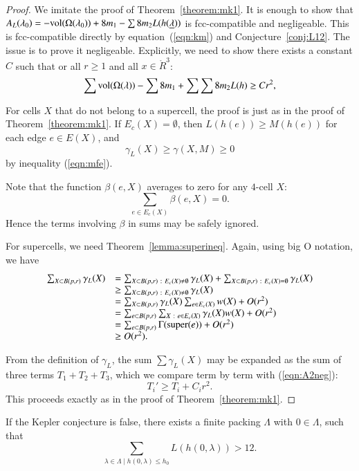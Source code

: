 \begin{proof}  We imitate the proof of Theorem~\ref{theorem:mk1}.
It is enough to show that $A_L(\lambda_0)  = -{\operatorname{vol}}(\Omega(\lambda_0)) + 8 m_1 - \sum 8 m_2 L(h({\underline{\lambda}}))$ is fcc-compatible and negligeable. 
This is fcc-compatible directly
by equation~(\ref{eqn:km})
and Conjecture~\ref{conj:L12}.  The issue is to prove it negligeable.  Explicitly, we need
to show there exists a constant  $C$ such that or all $r\ge 1$ and all $x\in\ring{R}^3$:
\begin{equation}\label{eqn:A2neg}
  \sum {\operatorname{vol}}(\Omega(\lambda)) -\sum 8m_1 + \sum \sum 8 m_2 L(h) \ge C r^2,
\end{equation}

For cells $X$ that do not belong to a supercell,
the proof is just as in the proof of Theorem~\ref{theorem:mk1}.
If $E_c(X)=\emptyset$, then 
$L(h(e))\ge M(h(e))$ for each edge $e\in E(X)$, and
$$\gamma_L(X)\ge \gamma(X,M)\ge 0$$ 
by inequality (\ref{eqn:mfe}).

Note that the function $\beta(e,X)$ averages to zero for any $4$-cell $X$:
$$
\sum_{e\in E_c(X)} \beta(e,X) = 0.
$$
Hence the terms involving $\beta$ in sums may be safely ignored.

For supercells, we need Theorem~\ref{lemma:superineq}.
Again, using big O notation, we have
$$
\begin{array}{lll}
\sum_{X\subset B(p,r)} \gamma_L(X) &= 
\sum_{X\subset B(p,r)\ :\  E_c(X)\ne\emptyset} \gamma_L(X) +
\sum_{X\subset B(p,r)\ :\  E_c(X)=\emptyset} \gamma_L(X) \\
&\ge \sum_{X\subset B(p,r)\ :\  E_c(X)\ne\emptyset} \gamma_L(X) \\
&=\sum_{X\subset B(p,r)}\gamma_L(X)\sum_{e \in E_c(X)}w(X) + O(r^2)\\
&=\sum_{e\subset B(p,r)}\sum_{X\ :\  e \in E_c(X)}\gamma_L(X)w(X) + O(r^2)\\
&=\sum_{e\subset B(p,r)}\Gamma({\operatorname{super}}(e)) + O(r^2)\\
&\ge O(r^2).
\end{array}
$$

From the definition of $\gamma_L$, the sum $\sum \gamma_L(X)$ may be expanded as the sum of three terms $T_1+T_2+T_3$, which we compare term by term with (\ref{eqn:A2neg}):
$$
T_i' \ge T_i + C_i r^2.
$$
This proceeds exactly as in the proof of Theorem~\ref{theorem:mk1}.
\end{proof}

\begin{corollary}\label{cor:CE} If the Kepler conjecture is false,
there exists a finite packing $\Lambda$ with $0\in\Lambda$, such
that
\begin{equation}\label{eqn:CE}
\sum_{\lambda\in\Lambda \mid h(0,\lambda)\le h_0} L(h(0,\lambda)) > 12.
\end{equation}
\end{corollary}


